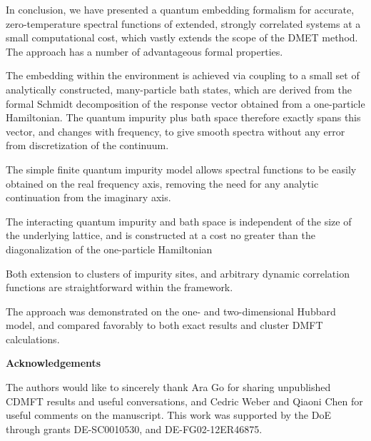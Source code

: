 \documentclass[aps,twocolumn,nobibnotes]{revtex4}
\begin{document}
In conclusion, we have presented a quantum embedding formalism for accurate, zero-temperature spectral functions of extended, strongly correlated systems 
at a small computational cost, which vastly 
extends the scope of the DMET method. The approach has a number of 
advantageous formal properties. 
\begin{inparaenum}
\item The embedding within the environment is achieved via coupling to a small set of analytically constructed, many-particle bath states,
    which are derived from the formal Schmidt decomposition of the response vector obtained from a one-particle Hamiltonian. The quantum impurity
    plus bath space therefore exactly spans this vector, and
    changes with frequency, to give smooth spectra without any error from discretization of the continuum.
\item The simple finite quantum impurity model allows spectral functions to be easily obtained on the real frequency axis, removing the 
    need for any analytic continuation from the imaginary axis.
\item The interacting quantum impurity and bath space is independent of the size of the underlying lattice, and is constructed at a cost no greater than the
    diagonalization of the one-particle Hamiltonian
\item Both extension to clusters of impurity sites, and arbitrary dynamic correlation functions are straightforward within the framework.
\end{inparaenum}
The approach was demonstrated on the one- and two-dimensional Hubbard model, and compared favorably to both exact results and cluster DMFT calculations. 

{\bf Acknowledgements}

The authors would like to sincerely thank Ara Go for sharing unpublished CDMFT results and useful 
conversations, and Cedric Weber and Qiaoni Chen for useful comments on the manuscript.
This work was supported by the DoE through grants DE-SC0010530, and DE-FG02-12ER46875.
\end{document}
